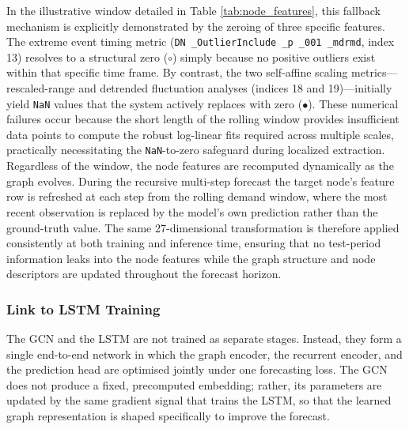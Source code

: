 In the illustrative window detailed in Table \ref{tab:node_features}, this fallback mechanism is explicitly demonstrated by the zeroing of three specific features. The extreme event timing metric (\texttt{DN \_OutlierInclude \_p \_001 \_mdrmd}, index 13) resolves to a structural zero (\(\circ\)) simply because no positive outliers exist within that specific time frame. By contrast, the two self-affine scaling metrics---rescaled-range and detrended fluctuation analyses (indices 18 and 19)---initially yield \texttt{NaN} values that the system actively replaces with zero (\(\bullet\)). These numerical failures occur because the short length of the rolling window provides insufficient data points to compute the robust log-linear fits required across multiple scales, practically necessitating the \texttt{NaN}-to-zero safeguard during localized extraction.
Regardless of the window, the node features are recomputed dynamically as the
graph evolves.  During the recursive multi-step forecast the target node's
feature row is refreshed at each step from the rolling demand window, where
the most recent observation is replaced by the model's own prediction rather
than the ground-truth value.  The same 27-dimensional transformation is
therefore applied consistently at both training and inference time, ensuring
that no test-period information leaks into the node features while the graph
structure and node descriptors are updated throughout the forecast horizon.

\subsubsection{Link to LSTM Training}

The GCN and the LSTM are not trained as separate stages. Instead, they form a
single end-to-end network in which the graph encoder, the recurrent encoder,
and the prediction head are optimised jointly under one forecasting loss. The
GCN does not produce a fixed, precomputed embedding; rather, its parameters are
updated by the same gradient signal that trains the LSTM, so that the learned
graph representation is shaped specifically to improve the forecast.

